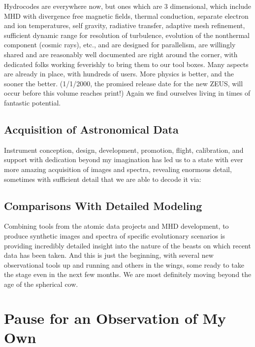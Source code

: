 \documentclass[proceedings]{rmaa}
\begin{document}
        Hydrocodes are everywhere now, but ones which are 3 dimensional, 
which include MHD with divergence free magnetic fields, thermal 
conduction, separate electron and ion temperatures, self gravity, 
radiative transfer, adaptive mesh refinement, sufficient dynamic range 
for resolution of turbulence, evolution of the nonthermal component 
(cosmic rays), etc., and are designed for parallelism, are willingly 
shared and are reasonably well documented are right around the corner, 
with dedicated folks working feverishly to bring them to our tool boxes.   
Many aspects are already in place, with hundreds of users.  More physics  
is better, and the sooner the better.  (1/1/2000, the promised release 
date for the new ZEUS, will occur before this volume reaches print!)  
Again we find ourselves living in times of fantastic potential.
\vspace*{-0.5ex}

\subsection{Acquisition of Astronomical Data}
\vspace*{-0.5ex}

        Instrument conception, design, development, promotion, flight, 
calibration, and support with dedication beyond my imagination has led us 
to a state with ever more amazing acquisition of images and spectra, 
revealing enormous detail, sometimes with sufficient detail that we are 
able to decode it via:
\vspace*{-0.5ex}

\subsection{Comparisons With Detailed Modeling}
\vspace*{-0.5ex}

        Combining tools from the atomic data projects and MHD 
development, to produce synthetic images and spectra of specific 
evolutionary scenarios is providing incredibly detailed insight into the  
nature of the beasts on which recent data has been taken.  And this is 
just the beginning, with several new observational tools up and running 
and others in the wings, some ready to take the stage even in the next 
few months.  We are most definitely moving beyond the age of the 
spherical cow.
\vspace*{-0.5ex}

\section{Pause for an Observation of My Own}
\vspace*{-0.5ex}
\end{document}
